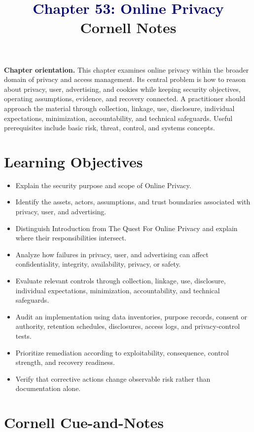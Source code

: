 \documentclass[11pt]{article}
\title{\textcolor{Navy}{Chapter 53: Online Privacy}\\[2mm]\large Cornell Notes}
\author{}
\date{}
\begin{document}
\maketitle
\thispagestyle{fancy}
\vspace{-1.5em}
\begin{orientationbox}
\textbf{Chapter orientation.} This chapter examines online privacy within the broader domain of privacy and access management. Its central problem is how to reason about privacy, user, advertising, and cookies while keeping security objectives, operating assumptions, evidence, and recovery connected. A practitioner should approach the material through collection, linkage, use, disclosure, individual expectations, minimization, accountability, and technical safeguards. Useful prerequisites include basic risk, threat, control, and systems concepts.
\end{orientationbox}
\section*{Learning Objectives}
\begin{itemize}
\item Explain the security purpose and scope of Online Privacy.
\item Identify the assets, actors, assumptions, and trust boundaries associated with privacy, user, and advertising.
\item Distinguish Introduction from The Quest For Online Privacy and explain where their responsibilities intersect.
\item Analyze how failures in privacy, user, and advertising can affect confidentiality, integrity, availability, privacy, or safety.
\item Evaluate relevant controls through collection, linkage, use, disclosure, individual expectations, minimization, accountability, and technical safeguards.
\item Audit an implementation using data inventories, purpose records, consent or authority, retention schedules, disclosures, access logs, and privacy-control tests.
\item Prioritize remediation according to exploitability, consequence, control strength, and recovery readiness.
\item Verify that corrective actions change observable risk rather than documentation alone.
\end{itemize}
\section*{Cornell Cue-and-Notes}
\end{document}
